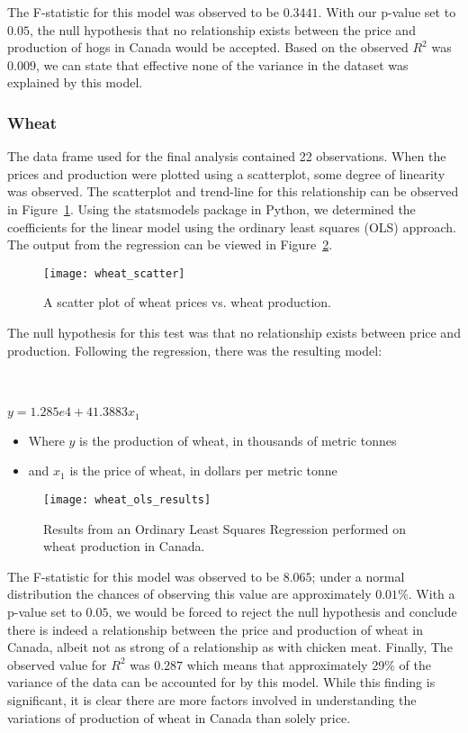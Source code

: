 The F-statistic for this model was observed to be $0.3441$.
With our p-value set to $0.05$, the null hypothesis that no relationship exists between the price and production of hogs in Canada would be accepted.
Based on the observed $R^2$ was $0.009$, we can state that effective none of the variance in the dataset was explained by this model.

\subsubsection{Wheat}

The data frame used for the final analysis contained 22 observations.
When the prices and production were plotted using a scatterplot, some degree of linearity was observed.
The scatterplot and trend-line for this relationship can be observed in Figure~\ref{fig:wheat_scatter}.
Using the statsmodels package in Python, we determined the coefficients for the linear model using the ordinary least squares (OLS) approach.
The output from the regression can be viewed in Figure~\ref{fig:wheat_ols}.

\begin{figure}
    \texttt{[image: wheat\_scatter]}
    \caption{A scatter plot of wheat prices vs. wheat production.}
    \label{fig:wheat_scatter}
\end{figure}

The null hypothesis for this test was that no relationship exists between price and production.
Following the regression, there was the resulting model:

\\~\\

\tabto{5cm} $y = 1.285e4 + 41.3883x_1$

\begin{itemize}
    \item Where $y$ is the production of wheat, in thousands of metric tonnes
    \item and $x_1$ is the price of wheat, in dollars per metric tonne
\end{itemize}

\begin{figure}
    \texttt{[image: wheat\_ols\_results]}
    \caption{Results from an Ordinary Least Squares Regression performed on wheat production in Canada.}
    \label{fig:wheat_ols}
\end{figure}

The F-statistic for this model was observed to be $8.065$; under a normal distribution the chances of observing this value are approximately $0.01\%$.
With a p-value set to $0.05$, we would be forced to reject the null hypothesis and conclude there is indeed a relationship between the price and production of wheat in Canada, albeit not as strong of a relationship as with chicken meat.
Finally, The observed value for $R^2$ was $0.287$ which means that approximately 29\% of the variance of the data can be accounted for by this model.
While this finding is significant, it is clear there are more factors involved in understanding the variations of production of wheat in Canada than solely price.


